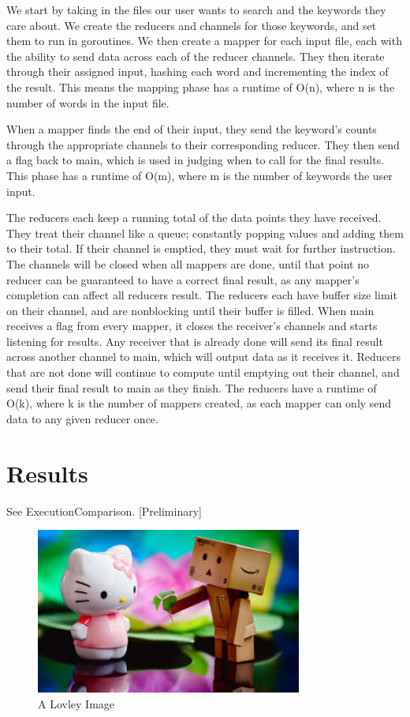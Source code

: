 \documentclass[report]{IEEEtran}
\begin{document}
We start by taking in the files our user wants to search and the keywords they care about. We create the reducers and channels for those keywords, and set them to run in goroutines. We then create a mapper for each input file, each with the ability to send data across each of the reducer channels. They then iterate through their assigned input, hashing each word and incrementing the index of the result. This means the mapping phase has a runtime of O(n), where n is the number of words in the input file.

When a mapper finds the end of their input, they send the keyword's counts through the appropriate channels to their corresponding reducer. They then send a flag back to main, which is used in judging when to call for the final results. This phase has a runtime of O(m), where m is the number of keywords the user input.

The reducers each keep a running total of the data points they have received. They treat their channel like a queue; constantly popping values and adding them to their total. If their channel is emptied, they must wait for further instruction. The channels will be closed when all mappers are done, until that point no reducer can be guaranteed to have a correct final result, as any mapper's completion can affect all reducers result. The reducers each have buffer size limit on their channel, and are nonblocking until their buffer is filled. When main receives a flag from every mapper, it closes the receiver's channels and starts listening for results. Any receiver that is already done will send its final result across another channel to main, which will output data as it receives it. Reducers that are not done will continue to compute until emptying out their channel, and send their final result to main as they finish. The reducers have a runtime of O(k), where k is the number of mappers created, as each mapper can only send data to any given reducer once.

\section{Results}
See ExecutionComparison.
[Preliminary]

\begin{figure}[h]
\centering
	\includegraphics[width = 8.75cm]{image2}
	\caption{A Lovley Image}
		
\end{figure}
\end{document}

